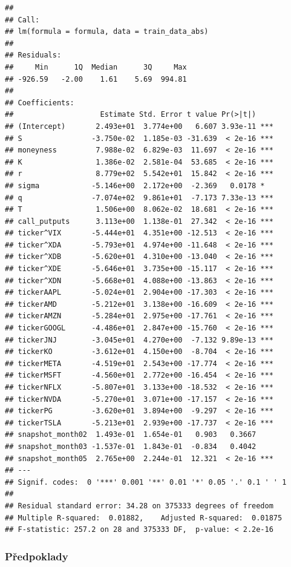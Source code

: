\documentclass[
]{article}
\begin{document}
\begin{verbatim}
## 
## Call:
## lm(formula = formula, data = train_data_abs)
## 
## Residuals:
##     Min      1Q  Median      3Q     Max 
## -926.59   -2.00    1.61    5.69  994.81 
## 
## Coefficients:
##                    Estimate Std. Error t value Pr(>|t|)    
## (Intercept)       2.493e+01  3.774e+00   6.607 3.93e-11 ***
## S                -3.750e-02  1.185e-03 -31.639  < 2e-16 ***
## moneyness         7.988e-02  6.829e-03  11.697  < 2e-16 ***
## K                 1.386e-02  2.581e-04  53.685  < 2e-16 ***
## r                 8.779e+02  5.542e+01  15.842  < 2e-16 ***
## sigma            -5.146e+00  2.172e+00  -2.369   0.0178 *  
## q                -7.074e+02  9.861e+01  -7.173 7.33e-13 ***
## T                 1.506e+00  8.062e-02  18.681  < 2e-16 ***
## call_putputs      3.113e+00  1.138e-01  27.342  < 2e-16 ***
## ticker^VIX       -5.444e+01  4.351e+00 -12.513  < 2e-16 ***
## ticker^XDA       -5.793e+01  4.974e+00 -11.648  < 2e-16 ***
## ticker^XDB       -5.620e+01  4.310e+00 -13.040  < 2e-16 ***
## ticker^XDE       -5.646e+01  3.735e+00 -15.117  < 2e-16 ***
## ticker^XDN       -5.668e+01  4.088e+00 -13.863  < 2e-16 ***
## tickerAAPL       -5.024e+01  2.904e+00 -17.303  < 2e-16 ***
## tickerAMD        -5.212e+01  3.138e+00 -16.609  < 2e-16 ***
## tickerAMZN       -5.284e+01  2.975e+00 -17.761  < 2e-16 ***
## tickerGOOGL      -4.486e+01  2.847e+00 -15.760  < 2e-16 ***
## tickerJNJ        -3.045e+01  4.270e+00  -7.132 9.89e-13 ***
## tickerKO         -3.612e+01  4.150e+00  -8.704  < 2e-16 ***
## tickerMETA       -4.519e+01  2.543e+00 -17.774  < 2e-16 ***
## tickerMSFT       -4.560e+01  2.772e+00 -16.454  < 2e-16 ***
## tickerNFLX       -5.807e+01  3.133e+00 -18.532  < 2e-16 ***
## tickerNVDA       -5.270e+01  3.071e+00 -17.157  < 2e-16 ***
## tickerPG         -3.620e+01  3.894e+00  -9.297  < 2e-16 ***
## tickerTSLA       -5.213e+01  2.939e+00 -17.737  < 2e-16 ***
## snapshot_month02  1.493e-01  1.654e-01   0.903   0.3667    
## snapshot_month03 -1.537e-01  1.843e-01  -0.834   0.4042    
## snapshot_month05  2.765e+00  2.244e-01  12.321  < 2e-16 ***
## ---
## Signif. codes:  0 '***' 0.001 '**' 0.01 '*' 0.05 '.' 0.1 ' ' 1
## 
## Residual standard error: 34.28 on 375333 degrees of freedom
## Multiple R-squared:  0.01882,    Adjusted R-squared:  0.01875 
## F-statistic: 257.2 on 28 and 375333 DF,  p-value: < 2.2e-16
\end{verbatim}

\subsubsection{Předpoklady}\label{pux159edpoklady}
\end{document}
